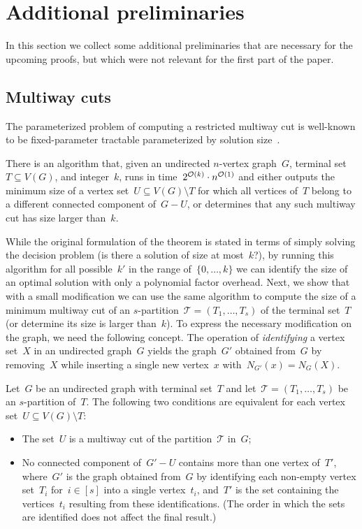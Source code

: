 \section{Additional preliminaries} \label{sec:more:prelims}
In this section we collect some additional preliminaries that are necessary for the upcoming proofs, but which were not relevant for the first part of the paper. 

\subsection{Multiway cuts}
The parameterized problem of computing a restricted multiway cut is well-known to be fixed-parameter tractable parameterized by solution size~\cite{CyganPPW13}.

\begin{theorem} \label{thm:multiway:marx}
There is an algorithm that, given an undirected $n$-vertex graph~$G$, terminal set~$T \subseteq V(G)$, and integer~$k$, runs in time~$2^{\mathcal{O}(k)} \cdot n^{\mathcal{O}(1)}$ and either outputs the minimum size of a vertex set~$U \subseteq V(G) \setminus T$ for which all vertices of~$T$ belong to a different connected component of~$G - U$, or determines that any such multiway cut has size larger than~$k$. 
\end{theorem}

While the original formulation of the theorem is stated in terms of simply solving the decision problem (is there a solution of size at most~$k$?), by running this algorithm for all possible~$k'$ in the range of~$\{0, \ldots, k\}$ we can identify the size of an optimal solution with only a polynomial factor overhead. Next, we show that with a small modification we can use the same algorithm to compute the size of a minimum multiway cut of an $s$-partition~$\mathcal{T} = (T_1, \ldots, T_s)$ of the terminal set~$T$ (or determine its size is larger than~$k$). To express the necessary modification on the graph, we need the following concept. The operation of \emph{identifying} a vertex set~$X$ in an undirected graph~$G$ yields the graph~$G'$ obtained from~$G$ by removing~$X$ while inserting a single new vertex~$x$ with~$N_{G'}(x) = N_G(X)$.

\begin{observation} \label{obs:mwc:partition:or:set}
Let~$G$ be an undirected graph with terminal set~$T$ and let~$\mathcal{T} = (T_1, \ldots, T_s)$ be an $s$-partition of~$T$. The following two conditions are equivalent for each vertex set~$U \subseteq V(G) \setminus T$:
\begin{itemize}
	\item The set~$U$ is a multiway cut of the partition~$\mathcal{T}$ in~$G$;
	\item No connected component of~$G' - U$ contains more than one vertex of~$T'$, where~$G'$ is the graph obtained from~$G$ by identifying each non-empty vertex set~$T_i$ for~$i \in [s]$ into a single vertex~$t_i$, and~$T'$ is the set containing the vertices~$t_i$ resulting from these identifications. (The order in which the sets are identified does not affect the final result.)
\end{itemize}
\end{observation}

